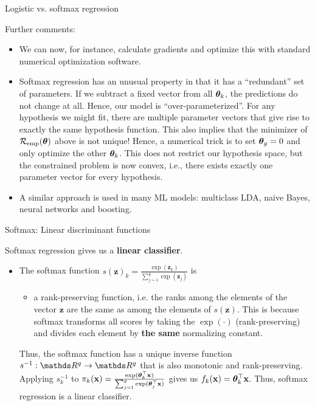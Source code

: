 \documentclass[11pt,compress,t,notes=noshow, xcolor=table]{beamer}
\begin{document}
\begin{vbframe}{Logistic vs. softmax regression}

Further comments:

\begin{itemize}

\item We can now, for instance, calculate gradients and optimize this with standard numerical optimization software.


\item Softmax regression has an unusual property in that it has a \enquote{redundant} set of parameters. If we subtract a fixed vector
  from all $\bm{\theta}_k$, the predictions do not change at all.
  Hence,  our model is \enquote{over-parameterized}. For any hypothesis we might fit,
  there are multiple parameter vectors that give rise to exactly the same hypothesis function.
  This also implies that the minimizer of $\mathcal{R}_{\text{emp}}(\bm{\theta})$ above is not unique!
  Hence, a numerical trick is to set $\bm{\theta}_g = 0$ and only optimize the other $\bm{\theta}_k$. This does not restrict our hypothesis space, but the constrained problem is now convex, i.e., there exists exactly one parameter vector for every hypothesis.

\item A similar approach is used in many ML models: multiclass LDA, naive Bayes, neural networks and boosting.

\end{itemize}

\end{vbframe} 

\begin{vbframe}{Softmax: Linear discriminant functions}

Softmax regression gives us a \textbf{linear classifier}. 

\begin{itemize}
  \item The softmax function $s(\bm{z})_k = \frac{\exp(\bm{z}_k)}{\sum_{j = 1}^g \exp \left(\bm{z}_j\right)}$ is 

\begin{itemize}
  \item a rank-preserving function, i.e.  the ranks among the elements of the vector $\bm{z}$ are the same as among the elements of $s(\bm{z})$. This is because softmax transforms all scores by taking the $\exp(\cdot)$ (rank-preserving) and divides each element by \textbf{the same} normalizing constant. 
\end{itemize}

Thus, the softmax function has a unique inverse function $s^{-1}: \R^g \to \R^g$ that is also monotonic and rank-preserving. Applying $s_k^{-1}$ to $\pi_k(\mathbf{x}) = \frac{\exp(\bm{\theta}_k^\top \mathbf{x})}{\sum_{j = 1}^g \exp(\bm{\theta}_j^\top \mathbf{x})}$ gives us $f_k(\mathbf{x}) = \bm{\theta}_k^\top \mathbf{x}$. Thus, softmax regression is a linear classifier. 
\end{itemize}

\end{vbframe}
\end{document}
